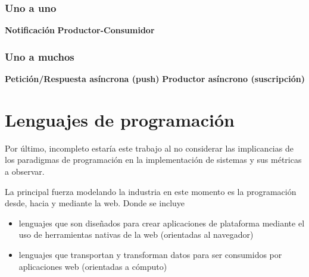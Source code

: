 \subsubsection{Uno a uno}
\textbf{Notificación}
\textbf{Productor-Consumidor}

\subsubsection{Uno a muchos}
\textbf{Petición/Respuesta asíncrona (push)}
\textbf{Productor asíncrono (suscripción)}

\section{Lenguajes de programación} %
\label{sec:lenguajes_de_programación}

Por último, incompleto estaría este trabajo al no considerar las implicancias de los paradigmas de programación en la implementación de sistemas y sus métricas a observar.

La principal fuerza modelando la industria en este momento es la programación desde, hacia y mediante la web. Donde se incluye
\begin{itemize}
  \item lenguajes que son diseñados para crear aplicaciones de plataforma mediante el uso de herramientas nativas de la web (orientadas al navegador)
  \item lenguajes que transportan y transforman datos para ser consumidos por aplicaciones web (orientadas a cómputo)
\end{itemize}

\subsubsection{}

